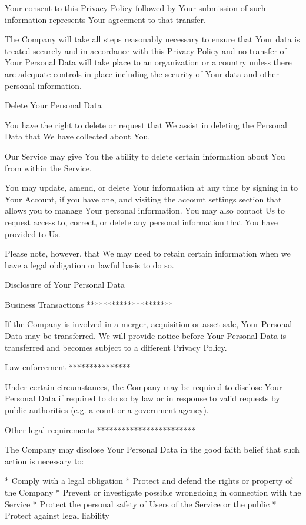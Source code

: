 Your consent to this Privacy Policy followed by Your submission of such
information represents Your agreement to that transfer.

The Company will take all steps reasonably necessary to ensure that Your data
is treated securely and in accordance with this Privacy Policy and no transfer
of Your Personal Data will take place to an organization or a country unless
there are adequate controls in place including the security of Your data and
other personal information.

Delete Your Personal Data  
~~~~~~~~~~~~~~~~~~~~~~~~~

You have the right to delete or request that We assist in deleting the
Personal Data that We have collected about You.

Our Service may give You the ability to delete certain information about You
from within the Service.

You may update, amend, or delete Your information at any time by signing in to
Your Account, if you have one, and visiting the account settings section that
allows you to manage Your personal information. You may also contact Us to
request access to, correct, or delete any personal information that You have
provided to Us.

Please note, however, that We may need to retain certain information when we
have a legal obligation or lawful basis to do so.

Disclosure of Your Personal Data  
~~~~~~~~~~~~~~~~~~~~~~~~~~~~~~~~

Business Transactions  
*********************

If the Company is involved in a merger, acquisition or asset sale, Your
Personal Data may be transferred. We will provide notice before Your Personal
Data is transferred and becomes subject to a different Privacy Policy.

Law enforcement  
***************

Under certain circumstances, the Company may be required to disclose Your
Personal Data if required to do so by law or in response to valid requests by
public authorities (e.g. a court or a government agency).

Other legal requirements  
************************

The Company may disclose Your Personal Data in the good faith belief that such
action is necessary to:

  * Comply with a legal obligation
  * Protect and defend the rights or property of the Company
  * Prevent or investigate possible wrongdoing in connection with the Service
  * Protect the personal safety of Users of the Service or the public
  * Protect against legal liability

